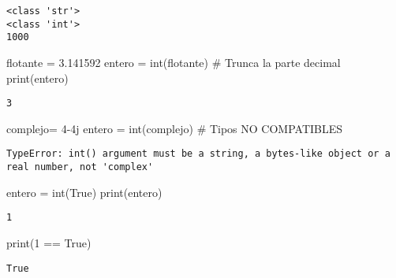 \documentclass[
  letterpaper,
  DIV=11,
  numbers=noendperiod]{scrreprt}
\newenvironment{Shaded}{\begin{snugshade}}{\end{snugshade}}
\newcommand{\BuiltInTok}[1]{\textcolor[rgb]{0.00,0.23,0.31}{#1}}
\newcommand{\CommentTok}[1]{\textcolor[rgb]{0.37,0.37,0.37}{#1}}
\newcommand{\DecValTok}[1]{\textcolor[rgb]{0.68,0.00,0.00}{#1}}
\newcommand{\FloatTok}[1]{\textcolor[rgb]{0.68,0.00,0.00}{#1}}
\newcommand{\NormalTok}[1]{\textcolor[rgb]{0.00,0.23,0.31}{#1}}
\newcommand{\OperatorTok}[1]{\textcolor[rgb]{0.37,0.37,0.37}{#1}}
\newcommand{\OtherTok}[1]{\textcolor[rgb]{0.00,0.23,0.31}{#1}}
\newcommand{\VariableTok}[1]{\textcolor[rgb]{0.07,0.07,0.07}{#1}}
\begin{document}
\begin{verbatim}
<class 'str'>
<class 'int'>
1000
\end{verbatim}

\begin{Shaded}
\begin{Highlighting}[]
\NormalTok{flotante }\OperatorTok{=} \FloatTok{3.141592}
\NormalTok{entero  }\OperatorTok{=} \BuiltInTok{int}\NormalTok{(flotante) }\CommentTok{\# Trunca la parte decimal}
\BuiltInTok{print}\NormalTok{(entero)}
\end{Highlighting}
\end{Shaded}

\begin{verbatim}
3
\end{verbatim}

\begin{Shaded}
\begin{Highlighting}[]
\NormalTok{complejo}\OperatorTok{=} \DecValTok{4}\OperatorTok{{-}}\OtherTok{4j}
\NormalTok{entero }\OperatorTok{=} \BuiltInTok{int}\NormalTok{(complejo) }\CommentTok{\# Tipos NO COMPATIBLES}
\end{Highlighting}
\end{Shaded}

\begin{verbatim}
TypeError: int() argument must be a string, a bytes-like object or a real number, not 'complex'
\end{verbatim}

\begin{Shaded}
\begin{Highlighting}[]
\NormalTok{entero }\OperatorTok{=} \BuiltInTok{int}\NormalTok{(}\VariableTok{True}\NormalTok{) }
\BuiltInTok{print}\NormalTok{(entero)}
\end{Highlighting}
\end{Shaded}

\begin{verbatim}
1
\end{verbatim}

\begin{Shaded}
\begin{Highlighting}[]
\BuiltInTok{print}\NormalTok{(}\DecValTok{1} \OperatorTok{==} \VariableTok{True}\NormalTok{)}
\end{Highlighting}
\end{Shaded}

\begin{verbatim}
True
\end{verbatim}
\end{document}
